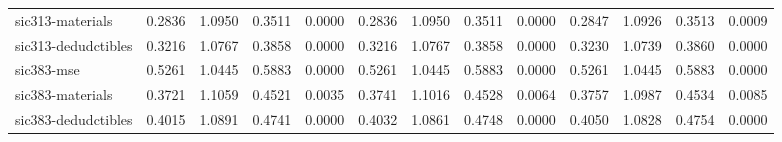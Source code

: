 \begin{tabular}{lcccccccccccc}
sic313-materials &    0.2836 &    1.0950 &    0.3511 &    0.0000 &    0.2836 &    1.0950 &    0.3511 &    0.0000 &    0.2847 &    1.0926 &    0.3513 &    0.0009 \\  
sic313-dedudctibles &    0.3216 &    1.0767 &    0.3858 &    0.0000 &    0.3216 &    1.0767 &    0.3858 &    0.0000 &    0.3230 &    1.0739 &    0.3860 &    0.0000 \\  \hline
sic383-mse &    0.5261 &    1.0445 &    0.5883 &    0.0000 &    0.5261 &    1.0445 &    0.5883 &    0.0000 &    0.5261 &    1.0445 &    0.5883 &    0.0000 \\  
sic383-materials &    0.3721 &    1.1059 &    0.4521 &    0.0035 &    0.3741 &    1.1016 &    0.4528 &    0.0064 &    0.3757 &    1.0987 &    0.4534 &    0.0085 \\  
sic383-dedudctibles &    0.4015 &    1.0891 &    0.4741 &    0.0000 &    0.4032 &    1.0861 &    0.4748 &    0.0000 &    0.4050 &    1.0828 &    0.4754 &    0.0000 \\  
\bottomrule
\end{tabular}
